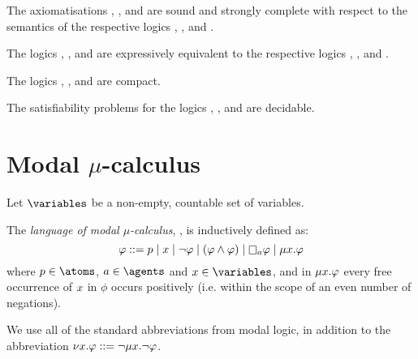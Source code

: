\begin{proposition}
The axiomatisations \axiomAmlK{}, \axiomAmlKFF{}, and \axiomAmlS{} are sound and strongly complete with respect to the semantics of the respective logics \logicAmlK{}, \logicAmlKFF{}, and \logicAmlS{}.
\end{proposition}

\begin{proposition}
The logics \logicAmlK{}, \logicAmlKFF{}, and \logicAmlS{} are expressively equivalent to the respective logics \logicK{}, \logicKFF{}, and \logicS{}.
\end{proposition}

\begin{proposition}
The logics \logicAmlK{}, \logicAmlKFF{}, and \logicAmlS{} are compact.
\end{proposition}

\begin{proposition}
The satisfiability problems for the logics \logicAmlK{}, \logicAmlKFF{}, and \logicAmlS{} are decidable.
\end{proposition}

\section{Modal $\mu$-calculus}\label{mu}

Let $\variables$ be a non-empty, countable set of variables.

\begin{definition}
The {\em language of modal $\mu$-calculus}, \langMu{}, is inductively defined as:
$$
\phi ::= 
    \atomP \mid
    \varX \mid
    \lnot \phi \mid
    (\phi \land \phi) \mid
    \necessaryA \phi \mid
    \lfpX \phi
$$
where $\atomP \in \atoms$, $\agentA \in \agents$ and $\varX \in \variables$, and in $\mu {x} . \varphi$ every free occurrence of $x$ in $\phi$ occurs positively (i.e. within the scope of an even number of negations).
\end{definition}

We use all of the standard abbreviations from modal logic, in addition to the abbreviation $\nu {x} . \varphi ::= \lnot \mu {x} . \lnot \varphi$.

